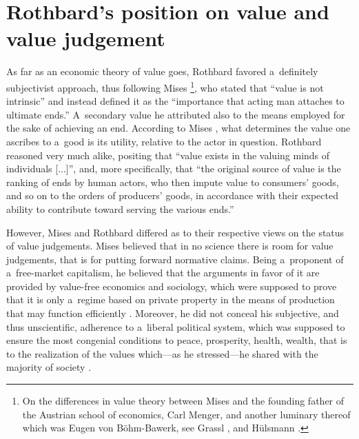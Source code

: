 \section{Rothbard's position on value and value judgement}

As far as an economic theory of value goes, Rothbard favored a~definitely subjectivist approach, thus following Mises \footnote{On the differences in value theory between Mises and the founding father of the Austrian school of economics, Carl Menger, and another luminary thereof which was Eugen von Böhm-Bawerk, see Grassl 
\parencites*[][p.96]{}[][pp.531–559]{}, %
 and Hülsmann 
\parencite*[][pp.388–391]{}.%
}, who stated that ``value is not intrinsic'' and instead defined it as the ``importance that acting man attaches to ultimate ends.'' A~secondary value he attributed also to the means employed for the sake of achieving an end. According to Mises 
\parencite*[][p.121]{}, %
 what determines the value one ascribes to a~good is its utility, relative to the actor in question. Rothbard 
\parencite*[][pp.103]{} %
 reasoned very much alike, positing that ``value exists in the valuing minds of individuals [...]'', and, more specifically, that ``the original source of value is the ranking of ends by human actors, who then impute value to consumers' goods, and so on to the orders of producers' goods, in accordance with their expected ability to contribute toward serving the various ends.''



However, Mises and Rothbard differed as to their respective views on the status of value judgements. Mises 
\parencite[see, e.g. 2008, p.10,][]{} %
 believed that in no science there is room for value judgements, that is for putting forward normative claims. Being a~proponent of a~free-market capitalism, he believed that the arguments in favor of it are provided by value-free economics and sociology, which were supposed to prove that it is only a~regime based on private property in the means of production that may function efficiently 
\parencite[][p.86]{}. %
 Moreover, he did not conceal his subjective, and thus unscientific, adherence to a~liberal political system, which was supposed to ensure the most congenial conditions to peace, prosperity, health, wealth, that is to the realization of the values which---as he stressed---he shared with the majority of society 
\parencite[see][pp.93–94]{}.%




